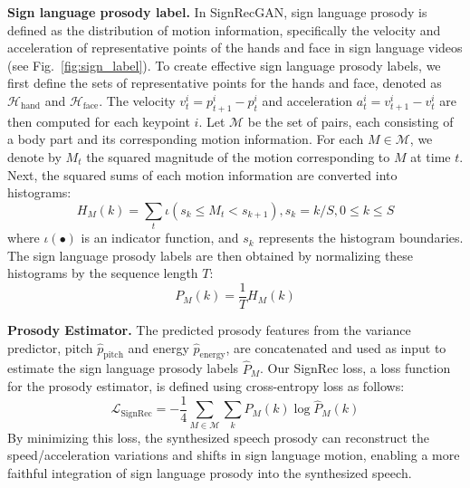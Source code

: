 \noindent
{\textbf{Sign language prosody label.}} In SignRecGAN, 
sign language prosody is defined as the distribution of motion information, 
specifically the velocity and acceleration of representative points of the hands and face in sign language videos (see Fig.~\ref{fig:sign_label}).
To create effective sign language prosody labels, 
we first define the sets of representative points for the hands and face, 
denoted as $\mathcal{H}_{\mathrm{hand}}$ and $\mathcal{H}_{\mathrm{face}}$. 
The velocity $v^i_t=p^i_{t+1}-p^i_t$ and acceleration $a^i_t=v^i_{t+1}-v^i_t$ are then computed for each keypoint $i$. 
Let $\mathcal{M}$ be the set of pairs, 
each consisting of a body part and its corresponding motion information. 
For each $M \in \mathcal{M}$, we denote by $M_t$ the squared magnitude of the motion corresponding to $M$ at time $t$.
Next, the squared sums of each motion information are converted into histograms:
\begin{equation}
H_{M}(k)=\sum_{t}\iota(s_k\le M_t <s_{k+1}), s_k=k/S, 0 \le k \le S
\end{equation}
where $\iota(\bullet)$ is an indicator function, and $s_k$ represents the histogram boundaries. The sign language prosody labels are then obtained by normalizing these histograms by the sequence length $T$:
\begin{equation}
P_{M}(k)=\frac{1}{T}H_{M}(k)
\end{equation}

\noindent
{\textbf{Prosody Estimator.}}
The predicted prosody features from the variance predictor, pitch $\hat{p}_{\mathrm{pitch}}$ and energy $\hat{p}_{\mathrm{energy}}$, are concatenated and used as input to estimate the sign language prosody labels $\hat{P}_{M}$. Our SignRec loss, a loss function for the prosody estimator, is defined using cross-entropy loss as follows:
\begin{equation}\label{eq:sign_rec}
\mathcal{L}_{\mathrm{SignRec}}=-\frac{1}{4}\sum_{M \in \mathcal{M}}\sum_{k}P_{M}(k)\log\hat{P}_{M}(k)
\end{equation}
By minimizing this loss, the synthesized speech prosody can reconstruct 
the speed/acceleration variations and shifts in sign language motion,
enabling a more faithful integration 
of sign language prosody into the synthesized speech.


